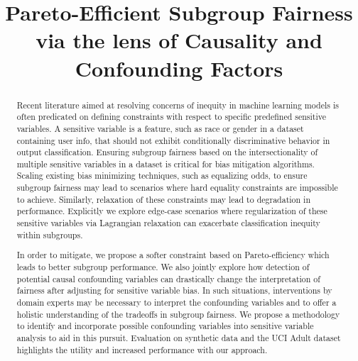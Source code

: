 \documentclass[sigconf]{acmart}
\begin{document}
\title{Pareto-Efficient Subgroup Fairness via the lens of Causality and Confounding Factors}







\begin{abstract}
Recent literature aimed at resolving concerns of inequity in machine learning models is often predicated on defining constraints with respect to specific predefined sensitive variables.  A sensitive variable is a feature, such as race or gender in a dataset containing user info, that should not exhibit conditionally discriminative behavior in output classification. Ensuring subgroup fairness based on the intersectionality of multiple sensitive variables in a dataset is critical for bias mitigation algorithms. Scaling existing bias minimizing techniques, such as equalizing odds, to ensure subgroup fairness may lead to scenarios where hard equality constraints are impossible to achieve. Similarly, relaxation of these constraints may lead to degradation in performance. Explicitly we explore edge-case scenarios where regularization of these sensitive variables via Lagrangian relaxation can exacerbate classification inequity within subgroups.  \par
In order to mitigate, we propose a softer constraint based on Pareto-efficiency which leads to better subgroup performance.  We also jointly explore how detection of potential causal confounding variables can drastically change the interpretation of fairness after adjusting for sensitive variable bias.  In such situations, interventions by domain experts may be necessary to interpret the confounding variables and to offer a holistic understanding of the tradeoffs in subgroup fairness.  We propose a methodology to identify and incorporate possible confounding variables into sensitive variable analysis to aid in this pursuit.  Evaluation on synthetic data and the UCI Adult dataset highlights the utility and increased performance with our approach.

\end{abstract}
\end{document}
